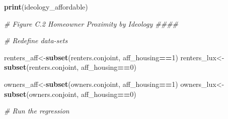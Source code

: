 \documentclass[]{article}
\newenvironment{Shaded}{\begin{snugshade}}{\end{snugshade}}
\newcommand{\CommentTok}[1]{\textcolor[rgb]{0.56,0.35,0.01}{\textit{#1}}}
\newcommand{\DecValTok}[1]{\textcolor[rgb]{0.00,0.00,0.81}{#1}}
\newcommand{\KeywordTok}[1]{\textcolor[rgb]{0.13,0.29,0.53}{\textbf{#1}}}
\newcommand{\NormalTok}[1]{#1}
\newcommand{\OperatorTok}[1]{\textcolor[rgb]{0.81,0.36,0.00}{\textbf{#1}}}
\begin{document}
\begin{Shaded}
\begin{Highlighting}[]
{{{\KeywordTok{print}\NormalTok{(ideology_affordable)}


\CommentTok{# Figure C.2 Homeowner Proximity by Ideology ####}

\CommentTok{# Redefine data-sets}

\NormalTok{renters_aff<-}\KeywordTok{subset}\NormalTok{(renters.conjoint, aff_housing}\OperatorTok{==}\DecValTok{1}\NormalTok{)}
\NormalTok{renters_lux<-}\KeywordTok{subset}\NormalTok{(renters.conjoint, aff_housing}\OperatorTok{==}\DecValTok{0}\NormalTok{)}

\NormalTok{owners_aff<-}\KeywordTok{subset}\NormalTok{(owners.conjoint, aff_housing}\OperatorTok{==}\DecValTok{1}\NormalTok{)}
\NormalTok{owners_lux<-}\KeywordTok{subset}\NormalTok{(owners.conjoint, aff_housing}\OperatorTok{==}\DecValTok{0}\NormalTok{)}

\CommentTok{# Run the regression }

}}}
\end{Highlighting}
\end{Shaded}
\end{document}
